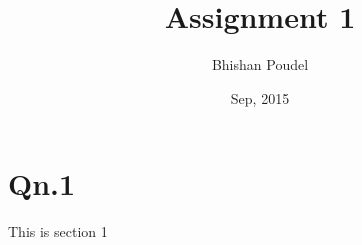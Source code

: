\documentclass[12pt]{article}
\title{Assignment 1}
\author{Bhishan Poudel}
\date{Sep, 2015}
\begin{document}
\maketitle


\section{Qn.1}
This is section 1
\end{document}
